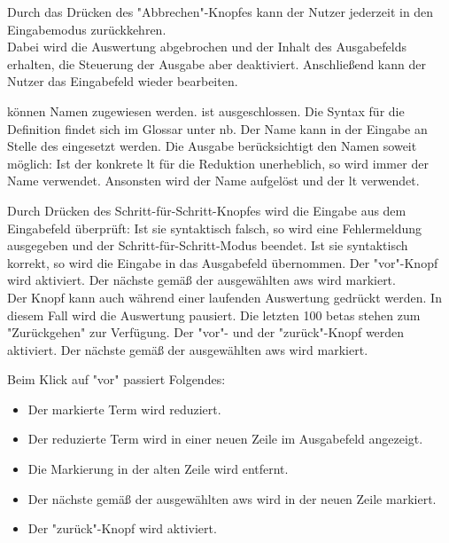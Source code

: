 \documentclass[parskip=full,11pt,twoside]{scrartcl}
\begin{document}
Durch das Drücken des "Abbrechen"-Knopfes kann der Nutzer jederzeit in den Eingabemodus zurückkehren.\\
Dabei wird die Auswertung abgebrochen und der Inhalt des Ausgabefelds erhalten, die Steuerung der Ausgabe aber deaktiviert.
Anschließend kann der Nutzer das Eingabefeld wieder bearbeiten.

 können Namen zugewiesen werden.
 ist ausgeschlossen.
Die Syntax für die Definition findet sich im Glossar unter \gls{nb}.
Der Name kann in der Eingabe an Stelle des  eingesetzt werden.
Die Ausgabe berücksichtigt den Namen soweit möglich:
Ist der konkrete \gls{lt} für die Reduktion unerheblich, so wird immer der Name verwendet.
Ansonsten wird der Name aufgelöst und der \gls{lt} verwendet.

Durch Drücken des Schritt-für-Schritt-Knopfes wird die Eingabe aus dem Eingabefeld überprüft:
Ist sie syntaktisch falsch, so wird eine Fehlermeldung ausgegeben und der Schritt-für-Schritt-Modus beendet.
Ist sie syntaktisch korrekt, so wird die Eingabe in das Ausgabefeld übernommen. 
Der "vor"-Knopf wird aktiviert.
Der nächste  gemäß der ausgewählten \gls{aws} wird markiert.
\\
Der Knopf kann auch während einer laufenden Auswertung gedrückt werden.
In diesem Fall wird die Auswertung pausiert.
Die letzten 100 \glspl{beta} stehen zum "Zurückgehen" zur Verfügung.
Der "vor"- und der "zurück"-Knopf werden aktiviert.
Der nächste  gemäß der ausgewählten \gls{aws} wird markiert.

Beim Klick auf "vor" passiert Folgendes:
\begin{itemize}
	\item Der markierte Term wird reduziert.
	\item Der reduzierte Term wird in einer neuen Zeile im Ausgabefeld angezeigt.
	\item Die Markierung in der alten Zeile wird entfernt.
	\item Der nächste  gemäß der ausgewählten \gls{aws} wird in der neuen Zeile markiert.
	\item Der "zurück"-Knopf wird aktiviert.
\end{itemize}
\end{document}

